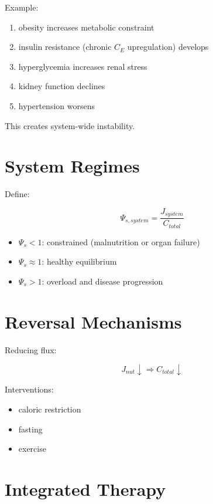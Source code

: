\documentclass[11pt]{article}
\begin{document}
Example:

\begin{enumerate}
    \item obesity increases metabolic constraint
    \item insulin resistance (chronic $C_E$ upregulation) develops
    \item hyperglycemia increases renal stress
    \item kidney function declines
    \item hypertension worsens
\end{enumerate}

This creates system-wide instability.

\section{System Regimes}

Define:

\begin{equation}
\Psi_{s,system} = \frac{J_{system}}{C_{total}}
\end{equation}

\begin{itemize}
    \item $\Psi_s < 1$: constrained (malnutrition or organ failure)
    \item $\Psi_s \approx 1$: healthy equilibrium
    \item $\Psi_s > 1$: overload and disease progression
\end{itemize}

\section{Reversal Mechanisms}

Reducing flux:

\begin{equation}
J_{nut} \downarrow \Rightarrow C_{total} \downarrow
\end{equation}

Interventions:

\begin{itemize}
    \item caloric restriction
    \item fasting
    \item exercise
\end{itemize}

\section{Integrated Therapy}
\end{document}

